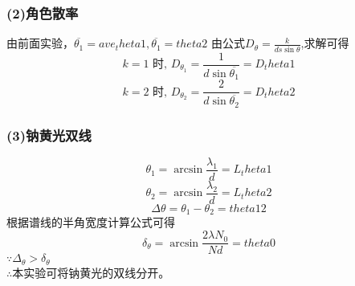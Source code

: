 \subsubsection*{(2)角色散率}
由前面实验，$ \overline{ {\theta}_1} = {{ave_theta1}}, \overline{ {\theta}_1} = {{theta2}}$
由公式$D_{\theta} = \displaystyle\frac{k}{ds\sin{\theta}}$,求解可得\\
$$k=1\text{ \ 时,\ } D_{ {\theta}_1} = \displaystyle\frac{1}{d\sin{\overline{ {\theta}_1}}} = {{D_theta1}}$$
$$k=2\text{ \ 时,\ } D_{ {\theta}_2} = \displaystyle\frac{2}{d\sin{\overline{ {\theta}_2}}} = {{D_theta2}}$$
\subsubsection*{(3)钠黄光双线}
$${\theta}_1 = \arcsin{\frac{ {\lambda}_1}{d}} = {{L_theta1}}$$
$${\theta}_2 = \arcsin{\frac{ {\lambda}_2}{d}} = {{L_theta2}}$$
$$\Delta{\theta} = {\theta}_1 - {\theta}_2 = {{theta12}}$$
根据谱线的半角宽度计算公式可得
$${\delta}_{\theta} = \arcsin{\frac{2\lambda N_0}{Nd}} = {{theta0}}$$
$\because {\Delta}_{\theta} > {\delta}_{\theta} $ \\
$\therefore$本实验可将钠黄光的双线分开。